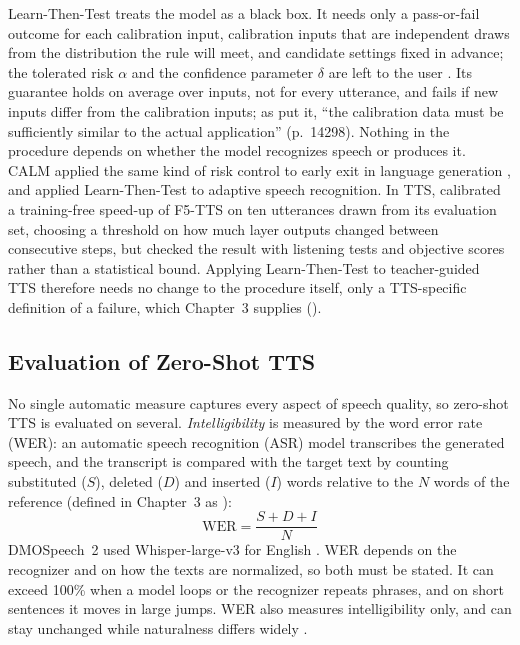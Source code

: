 Learn-Then-Test treats the model as a black box. It needs only a pass-or-fail outcome for each calibration input, calibration inputs that are independent draws from the distribution the rule will meet, and candidate settings fixed in advance; the tolerated risk $\alpha$ and the confidence parameter $\delta$ are left to the user \parencite{angelopoulos2023gentle,angelopoulos2025ltt}. Its guarantee holds on average over inputs, not for every utterance, and fails if new inputs differ from the calibration inputs; as \textcite{wu2025thought} put it, \enquote{the calibration data must be sufficiently similar to the actual application} (p.~14298). Nothing in the procedure depends on whether the model recognizes speech or produces it. CALM applied the same kind of risk control to early exit in language generation \parencite{schuster2022calm}, and \textcite{damri2026confident} applied Learn-Then-Test to adaptive speech recognition. In TTS, \textcite{sakpiboonchit2025smoothcache} calibrated a training-free speed-up of F5-TTS on ten utterances drawn from its evaluation set, choosing a threshold on how much layer outputs changed between consecutive steps, but checked the result with listening tests and objective scores rather than a statistical bound. Applying Learn-Then-Test to teacher-guided TTS therefore needs no change to the procedure itself, only a TTS-specific definition of a failure, which Chapter~3 supplies ().

\subsection{Evaluation of Zero-Shot TTS}
\label{sec:rrl-eval}

No single automatic measure captures every aspect of speech quality, so zero-shot TTS is evaluated on several. \emph{Intelligibility} is measured by the word error rate (WER): an automatic speech recognition (ASR) model transcribes the generated speech, and the transcript is compared with the target text by counting substituted ($S$), deleted ($D$) and inserted ($I$) words relative to the $N$ words of the reference \parencite{anastassiou2024seedtts,li2025dmospeech2} (defined in Chapter~3 as ):
\begin{equation}
\mathrm{WER} = \frac{S + D + I}{N}
\label{eq:rrl-wer}
\end{equation}
DMOSpeech~2 used Whisper-large-v3 for English \parencites[p.~31819]{li2025dmospeech2}{radford2023whisper}. WER depends on the recognizer and on how the texts are normalized, so both must be stated. It can exceed 100\% when a model loops or the recognizer repeats phrases, and on short sentences it moves in large jumps. WER also measures intelligibility only, and can stay unchanged while naturalness differs widely \parencite[p.~3]{khan2026drifttts}.

